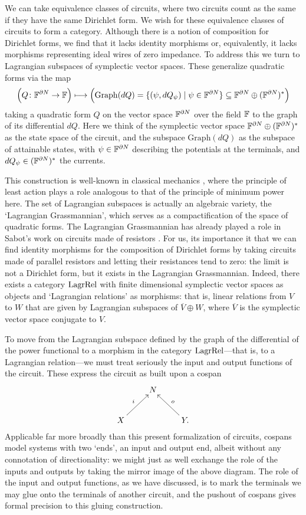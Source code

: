 We can take equivalence classes of circuits, where two circuits count as the
same if they have the same Dirichlet form.  We wish for these equivalence classes of circuits to form a category. Although
there is a notion of composition for Dirichlet forms, we find that it lacks
identity morphisms or, equivalently, it lacks morphisms representing ideal wires
of zero impedance. To address this we turn to Lagrangian subspaces of
symplectic vector spaces.  These generalize quadratic forms via the map
\[
  \Big(Q{\colon} {\mathbb F}^{\partial N} \to {\mathbb F}\Big) \longmapsto \Big(\mathrm{Graph}(dQ) =
  \{(\psi, dQ_\psi) \mid \psi \in {\mathbb F}^{\partial N} \} \subseteq {\mathbb F}^{\partial
  N} \oplus ({\mathbb F}^{\partial N})^\ast\Big)
\]
taking a quadratic form $Q$ on the vector space ${\mathbb F}^{\partial N}$
over the field ${\mathbb F}$ to the graph
of its differential $dQ$. Here we think of the symplectic vector space
${\mathbb F}^{\partial N} \oplus ({\mathbb F}^{\partial N})^\ast$ as the state space of the
circuit, and the subspace $\mathrm{Graph}(dQ)$ as the subspace of attainable
states, with $\psi \in {\mathbb F}^{\partial N}$ describing the potentials at the
terminals, and $dQ_\psi \in ({\mathbb F}^{\partial N})^\ast$ the currents. 

This construction is well-known in classical mechanics \cite{Weinstein}, where the principle of least action plays a role analogous to that of the principle of minimum power here.   The set of Lagrangian subspaces is actually an algebraic variety,
the `Lagrangian Grassmannian', which serves as a compactification of the
space of quadratic forms.  The Lagrangian Grassmannian has already played a
role in Sabot's work on circuits made of resistors \cite{Sabot1997,Sabot2004}.
For us, its importance it that we can find identity morphisms
for the composition of Dirichlet forms by taking circuits made of parallel resistors
and letting their resistances tend to zero: the limit is not a Dirichlet form, but
it exists in the Lagrangian Grassmannian.    Indeed, 
there exists a category $\mathrm{LagrRel}$ with finite dimensional
symplectic vector spaces as objects and `Lagrangian relations' as morphisms: 
that is, linear relations from $V$ to $W$ that are given by Lagrangian subspaces of $\overline{V} \oplus W$, where $\overline{V}$ is the symplectic vector space conjugate to $V$.   

To move from the Lagrangian subspace defined by the graph of the differential of
the power functional to a morphism in the category $\mathrm{LagrRel}$---that
is, to a Lagrangian relation---we must treat seriously the input and output
functions of the circuit. These express the circuit as built upon a cospan   
\[
  \xymatrix{
    & N \\
    X \ar[ur]^{i} && Y. \ar[ul]_o
  }
\]
Applicable far more broadly than this present formalization of circuits, cospans
model systems with two `ends', an input and output end, albeit without any
connotation of directionality: we might just as well exchange the role of the
inputs and outputs by taking the mirror image of the above diagram. The role of
the input and output functions, as we have discussed, is to mark the terminals
we may glue onto the terminals of another circuit, and the pushout of cospans
gives formal precision to this gluing construction.

